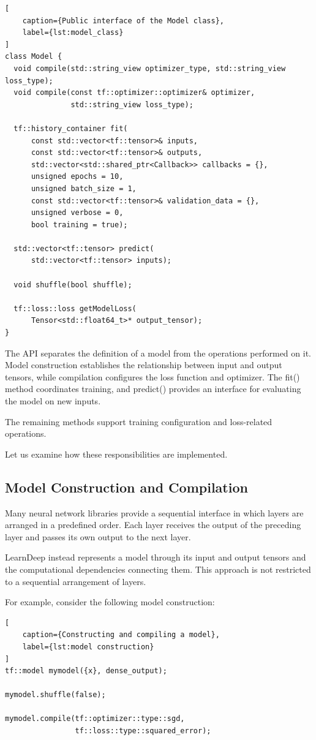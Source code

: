 \begin{lstlisting}[
    caption={Public interface of the Model class},
    label={lst:model_class}
]
class Model {
  void compile(std::string_view optimizer_type, std::string_view loss_type);
  void compile(const tf::optimizer::optimizer& optimizer,
               std::string_view loss_type);

  tf::history_container fit(
      const std::vector<tf::tensor>& inputs,
      const std::vector<tf::tensor>& outputs,
      std::vector<std::shared_ptr<Callback>> callbacks = {},
      unsigned epochs = 10,
      unsigned batch_size = 1,
      const std::vector<tf::tensor>& validation_data = {},
      unsigned verbose = 0,
      bool training = true);

  std::vector<tf::tensor> predict(
      std::vector<tf::tensor> inputs);

  void shuffle(bool shuffle);

  tf::loss::loss getModelLoss(
      Tensor<std::float64_t>* output_tensor);
}
\end{lstlisting}

The API separates the definition of a model from the
operations performed on it. Model construction establishes
the relationship between input and output tensors, while
compilation configures the loss function and optimizer.
The fit() method coordinates training, and predict() provides
an interface for evaluating the model on new inputs.

The remaining methods support training configuration and
loss-related operations.

Let us examine how these responsibilities are implemented.


\subsection{Model Construction and Compilation}

Many neural network libraries provide a sequential interface
in which layers are arranged in a predefined order. Each layer
receives the output of the preceding layer and passes its own
output to the next layer.

LearnDeep instead represents a model through its input and
output tensors and the computational dependencies connecting
them. This approach is not restricted to a sequential
arrangement of layers.

For example, consider the following model construction:

\begin{lstlisting}[
    caption={Constructing and compiling a model},
    label={lst:model construction}
]
tf::model mymodel({x}, dense_output);

mymodel.shuffle(false);

mymodel.compile(tf::optimizer::type::sgd,
                tf::loss::type::squared_error);
\end{lstlisting}

